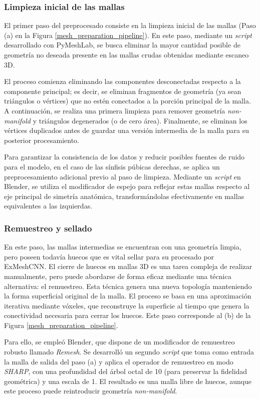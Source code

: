 \subsubsection{Limpieza inicial de las mallas}
El primer paso del preprocesado consiste en la limpieza inicial de las mallas (Paso (a) en la Figura \ref{mesh_preparation_pipeline}). En este paso, mediante un \textit{script} desarrollado con PyMeshLab, se busca eliminar la mayor cantidad posible de geometría no deseada presente en las mallas crudas obtenidas mediante escaneo 3D.

El proceso comienza eliminando las componentes desconectadas respecto a la componente principal; es decir, se eliminan fragmentos de geometría (ya sean triángulos o vértices) que no estén conectados a la porción principal de la malla. A continuación, se realiza una primera limpieza para remover geometría \textit{non-manifold} y triángulos degenerados (o de cero área). Finalmente, se eliminan los vértices duplicados antes de guardar una versión intermedia de la malla para su posterior procesamiento.

Para garantizar la consistencia de los datos y reducir posibles fuentes de ruido para el modelo, en el caso de las sínfisis púbicas derechas, se aplica un preprocesamiento adicional previo al paso de limpieza. Mediante un \textit{script} en Blender, se utiliza el modificador de espejo para reflejar estas mallas respecto al eje principal de simetría anatómica, transformándolas efectivamente en mallas equivalentes a las izquierdas.

\subsubsection{Remuestreo y sellado}
En este paso, las mallas intermedias se encuentran con una geometría limpia, pero poseen todavía huecos que es vital sellar para su procesado por ExMeshCNN. El cierre de huecos en mallas 3D es una tarea compleja de realizar manualmente, pero puede abordarse de forma eficaz mediante una técnica alternativa: el remuestreo. Esta técnica genera una nueva topología manteniendo la forma superficial original de la malla. El proceso se basa en una aproximación iterativa mediante vóxeles, que reconstruye la superficie al tiempo que genera la conectividad necesaria para cerrar los huecos. Este paso corresponde al (b) de la Figura \ref{mesh_preparation_pipeline}.

Para ello, se empleó Blender, que dispone de un modificador de remuestreo robusto llamado \textit{Remesh}. Se desarrolló un segundo \textit{script} que toma como entrada la malla de salida del paso (a) y aplica el operador de remuestreo en modo \textit{SHARP}, con una profundidad del árbol octal de 10 (para preservar la fidelidad geométrica) y una escala de 1. El resultado es una malla libre de huecos, aunque este proceso puede reintroducir geometría \textit{non-manifold}.

